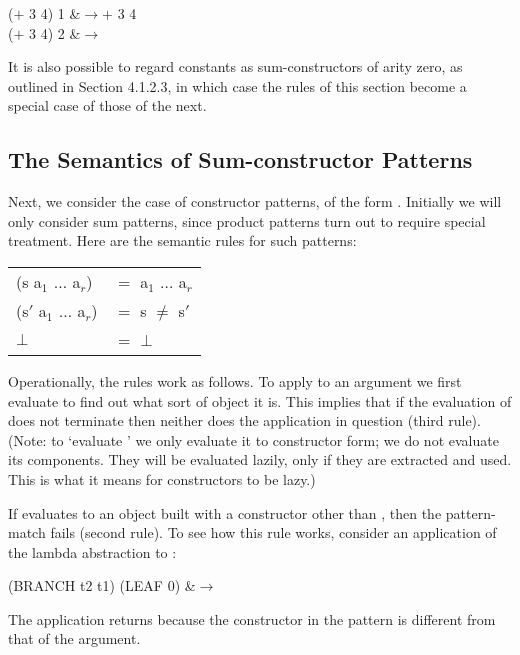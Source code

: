 \begin{mlalign}
    ($+$ 3 4) 1 &$\rightarrow +$ 3 4 \\
    ($+$ 3 4) 2 &$\rightarrow$ 
\end{mlalign}

It is also possible to regard constants as sum-constructors of arity zero, as outlined in Section 4.1.2.3, in which case the rules of this section become a special case of those of the next.

\subsection{The Semantics of Sum-constructor Patterns}
Next, we consider the case of constructor patterns, of the form . Initially we will only consider sum patterns, since product patterns turn out to require special treatment. Here are the semantic rules for such patterns:

\begin{mlcoded}
    \footnotesize
    \begin{tabular}{ll}
        \metafnbb{Eval}{\tlb{(s p$_1$ $\ldots$ p$_r$)}E} (s a$_1$ $\ldots$ a$_r$) &$=$ \metafnbb{Eval}{\tlb{p$_1$ $\ldots$ p$_r$}E} a$_1$ $\ldots$ a$_r$ \\
    \metafnbb{Eval}{\tlb{(s p$_1$ $\ldots$ p$_r$)}E} (s$'$ a$_1$ $\ldots$ a$_r$) &$=$ \text{FAIL}  \text{if} \quad s $\neq$ s$'$ \\
    \metafnbb{Eval}{\tlb{(s p$_1$ $\ldots$ p$_r$)}E} $\bot$ &$=$ $\bot$
    \end{tabular}
\end{mlcoded}

Operationally, the rules work as follows. To apply  to an argument  we first evaluate  to find out what sort of object it is. This implies that if the evaluation of  does not terminate then neither does the application in question (third rule). (Note: to `evaluate ' we only evaluate it to constructor form; we do not evaluate its components. They will be evaluated lazily, only if they are extracted and used. This is what it means for constructors to be lazy.)

If  evaluates to an object built with a constructor other than , then the pattern-match fails (second rule). To see how this rule works, consider an
application of the lambda abstraction  to :
\begin{mlalign}
    (BRANCH t2 t1) (LEAF 0) &$\rightarrow$ 
\end{mlalign}
The application returns  because the constructor in the pattern is different from that of the argument.

